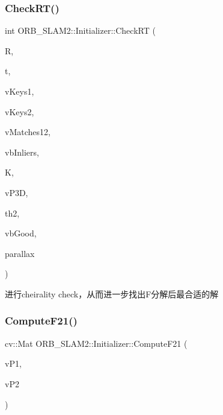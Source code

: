 \subsubsection{\texorpdfstring{Check\+R\+T()}{CheckRT()}}
{\footnotesize\ttfamily int O\+R\+B\+\_\+\+S\+L\+A\+M2\+::\+Initializer\+::\+Check\+RT (\begin{DoxyParamCaption}\item[{const cv\+::\+Mat \&}]{R,  }\item[{const cv\+::\+Mat \&}]{t,  }\item[{const vector$<$ cv\+::\+Key\+Point $>$ \&}]{v\+Keys1,  }\item[{const vector$<$ cv\+::\+Key\+Point $>$ \&}]{v\+Keys2,  }\item[{const vector$<$ \mbox{\hyperlink{class_o_r_b___s_l_a_m2_1_1_initializer_ad0bf21297bc6271e7d014ce41d6ff7d4}{Match}} $>$ \&}]{v\+Matches12,  }\item[{vector$<$ bool $>$ \&}]{vb\+Inliers,  }\item[{const cv\+::\+Mat \&}]{K,  }\item[{vector$<$ cv\+::\+Point3f $>$ \&}]{v\+P3D,  }\item[{float}]{th2,  }\item[{vector$<$ bool $>$ \&}]{vb\+Good,  }\item[{float \&}]{parallax }\end{DoxyParamCaption})\hspace{0.3cm}{\ttfamily [private]}}



进行cheirality check，从而进一步找出\+F分解后最合适的解 

\mbox{\label{class_o_r_b___s_l_a_m2_1_1_initializer_aaca077af095ae1de08ebb473af670d1d}} 
\subsubsection{\texorpdfstring{Compute\+F21()}{ComputeF21()}}
{\footnotesize\ttfamily cv\+::\+Mat O\+R\+B\+\_\+\+S\+L\+A\+M2\+::\+Initializer\+::\+Compute\+F21 (\begin{DoxyParamCaption}\item[{const vector$<$ cv\+::\+Point2f $>$ \&}]{v\+P1,  }\item[{const vector$<$ cv\+::\+Point2f $>$ \&}]{v\+P2 }\end{DoxyParamCaption})\hspace{0.3cm}{\ttfamily [private]}}



